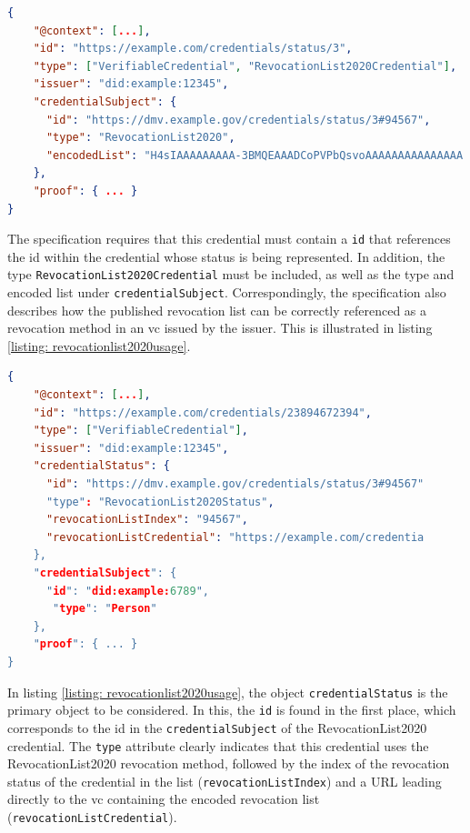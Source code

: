         \begin{lstlisting}[language=json, caption={[Example RevocationList2020 credentials]Example RevocationList2020 credentials (edited and extracted from \cite{longley_revocation_2021})}, captionpos=b, label={listing: revocationlist2020credential}]  
{
    "@context": [...],
    "id": "https://example.com/credentials/status/3", 
    "type": ["VerifiableCredential", "RevocationList2020Credential"],
    "issuer": "did:example:12345", 
    "credentialSubject": {
      "id": "https://dmv.example.gov/credentials/status/3#94567",
      "type": "RevocationList2020",
      "encodedList": "H4sIAAAAAAAAA-3BMQEAAADCoPVPbQsvoAAAAAAAAAAAAAAA..."
    },
    "proof": { ... }
}\end{lstlisting}

        The specification requires that this credential must contain a \texttt{id} that references the id within the credential whose status is being represented.  In addition, the type \texttt{RevocationList2020Credential} must be included, as well as the type and encoded list under \texttt{credentialSubject}. Correspondingly, the specification also describes how the published revocation list can be correctly referenced as a revocation method in an \ac{vc} issued by the issuer. This is illustrated in listing \ref{listing: revocationlist2020usage}.
        \newline
        
        \begin{lstlisting}[language=json, caption={[Example \ac{vc} referencing a RevocationList2020 credential]Example \ac{vc} referencing a RevocationList2020 credential (edited and extracted from \cite{longley_revocation_2021})}, captionpos=b, label={listing: revocationlist2020usage}]  
{
    "@context": [...],
    "id": "https://example.com/credentials/23894672394", 
    "type": ["VerifiableCredential"],
    "issuer": "did:example:12345",
    "credentialStatus": {
      "id": "https://dmv.example.gov/credentials/status/3#94567"
      "type": "RevocationList2020Status",
      "revocationListIndex": "94567",
      "revocationListCredential": "https://example.com/credentia
    }, 
    "credentialSubject": {
      "id": "did:example:6789",
       "type": "Person"
    },
    "proof": { ... } 
}\end{lstlisting}
    
    In listing \ref{listing: revocationlist2020usage}, the object \texttt{credentialStatus} is the primary object to be considered. In this, the \texttt{id} is found in the first place, which corresponds to the id in the \texttt{credentialSubject} of the RevocationList2020 credential. The \texttt{type} attribute clearly indicates that this credential uses the RevocationList2020 revocation method, followed by the index of the revocation status of the credential in the list (\texttt{revocationListIndex}) and a URL leading directly to the \ac{vc} containing the encoded revocation list (\texttt{revocationListCredential}). \cite{longley_revocation_2021}
    
